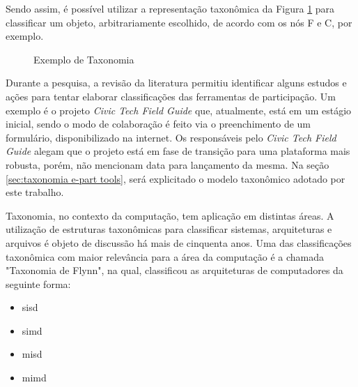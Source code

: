 \par
Sendo assim, é possível utilizar a representação taxonômica da Figura \ref{fig:exemploTaxonomia} para classificar um objeto, arbitrariamente escolhido,
de acordo com os nós F e C, por exemplo.

\begin{figure}[!ht]
\caption{Exemplo de Taxonomia}
\label{fig:exemploTaxonomia}  
\end{figure}

\par
Durante a pesquisa, a revisão da literatura permitiu identificar alguns estudos e ações para tentar elaborar classificações das ferramentas de participação.
Um exemplo é o projeto \textit{Civic Tech Field Guide} que, atualmente, está em um estágio inicial, sendo o modo de colaboração é feito via o preenchimento de um formulário, disponibilizado na internet. 
Os responsáveis pelo \textit{Civic Tech Field Guide} alegam que o projeto está em fase de transição para uma plataforma mais robusta, porém, não mencionam data para lançamento da mesma. 
Na seção \ref{sec:taxonomia e-part tools}, será explicitado o modelo taxonômico adotado por este trabalho.

\par
Taxonomia, no contexto da computação, tem aplicação em distintas áreas. A utilização de estruturas taxonômicas para classificar sistemas, arquiteturas e arquivos é objeto de discussão há mais de cinquenta anos. 
Uma das classificações taxonômica com maior relevância para a área da computação é a chamada "Taxonomia de Flynn",
na qual,  classificou as arquiteturas de computadores da seguinte forma:\\

\begin{minipage}{.66\textwidth}
    \begin{singlespace}
        \begin{itemize}
            \item \acrfull{sisd}
            \item \acrfull{simd}
            \item \acrfull{misd}
            \item \acrfull{mimd}
        \end{itemize}
    \end{singlespace}
\end{minipage}
\vspace{0.5cm}

